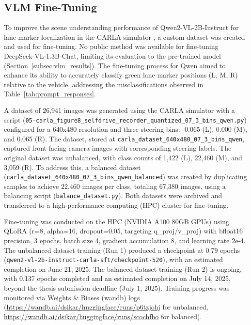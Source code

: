 \subsection{VLM Fine-Tuning}
\label{subsec:vlm_finetuning}

To improve the scene understanding performance of Qwen2-VL-2B-Instruct for lane marker localization in the CARLA simulator \cite{carla}, a custom dataset was created and used for fine-tuning. No public method was available for fine-tuning DeepSeek-VL-1.3B-Chat, limiting its evaluation to the pre-trained model (Section~\ref{subsec:vlm_results}). The fine-tuning process for Qwen aimed to enhance its ability to accurately classify green lane marker positions (L, M, R) relative to the vehicle, addressing the misclassifications observed in Table~\ref{tab:prompt_responses}.

A dataset of 26,941 images was generated using the CARLA simulator with a script (\texttt{05-carla\_figure8\_selfdrive\_recorder\_quantized\_07\_3\_bins\_qwen.py}) configured for a 640x480 resolution and three steering bins: -0.065 (L), 0.000 (M), and 0.065 (R). The dataset, stored at \texttt{carla\_dataset\_640x480\_07\_3\_bins\_qwen}, captured front-facing camera images with corresponding steering labels. The original dataset was unbalanced, with class counts of 1,422 (L), 22,460 (M), and 3,059 (R). To address this, a balanced dataset (\texttt{carla\_dataset\_640x480\_07\_3\_bins\_qwen\_balanced}) was created by duplicating samples to achieve 22,460 images per class, totaling 67,380 images, using a balancing script (\texttt{balance\_dataset.py}). Both datasets were archived and transferred to a high-performance computing (HPC) cluster for fine-tuning.

Fine-tuning was conducted on the HPC (NVIDIA A100 80GB GPUs) using QLoRA (r=8, alpha=16, dropout=0.05, targeting q\_proj/v\_proj) with bfloat16 precision, 3 epochs, batch size 4, gradient accumulation 8, and learning rate 2e-4. The unbalanced dataset training (Run 1) produced a checkpoint at 0.79 epochs (\texttt{qwen2-vl-2b-instruct-carla-sft/checkpoint-520}), with an estimated completion on June 21, 2025. The balanced dataset training (Run 2) is ongoing, with 0.137 epochs completed and an estimated completion on July 14, 2025, beyond the thesis submission deadline (July 1, 2025). Training progress was monitored via Weights \& Biases (wandb) logs (\url{https://wandb.ai/dsikar/huggingface/runs/p6tzjohj} for unbalanced, \url{https://wandb.ai/dsikar/huggingface/runs/scochfho} for balanced).

